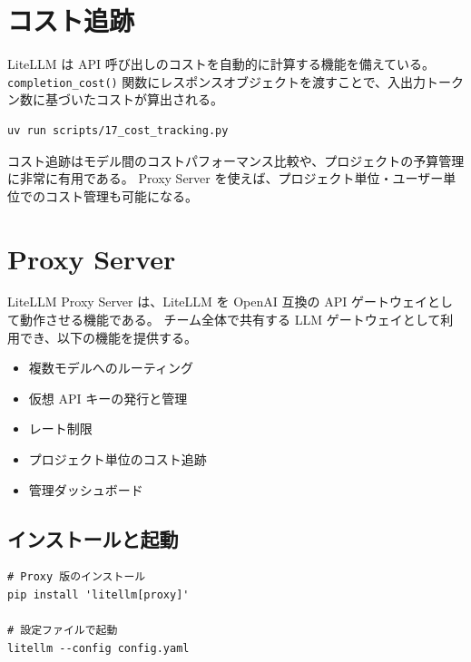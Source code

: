 \documentclass[a4paper,11pt]{ltjsarticle}
\newcommand{\code}[1]{\texttt{#1}}
\begin{document}
\section{コスト追跡}
\label{sec:cost}

LiteLLM は API 呼び出しのコストを自動的に計算する機能を備えている。
\code{completion\_cost()} 関数にレスポンスオブジェクトを渡すことで、入出力トークン数に基づいたコストが算出される。



\begin{lstlisting}[style=bash]
uv run scripts/17_cost_tracking.py
\end{lstlisting}

\begin{tipbox}[ポイント]
コスト追跡はモデル間のコストパフォーマンス比較や、プロジェクトの予算管理に非常に有用である。
Proxy Server を使えば、プロジェクト単位・ユーザー単位でのコスト管理も可能になる。
\end{tipbox}


\section{Proxy Server}
\label{sec:proxy}

LiteLLM Proxy Server は、LiteLLM を OpenAI 互換の API ゲートウェイとして動作させる機能である。
チーム全体で共有する LLM ゲートウェイとして利用でき、以下の機能を提供する。

\begin{itemize}
  \item 複数モデルへのルーティング
  \item 仮想 API キーの発行と管理
  \item レート制限
  \item プロジェクト単位のコスト追跡
  \item 管理ダッシュボード
\end{itemize}

\subsection{インストールと起動}

\begin{lstlisting}[style=bash]
# Proxy 版のインストール
pip install 'litellm[proxy]'

# 設定ファイルで起動
litellm --config config.yaml
\end{lstlisting}
\end{document}
